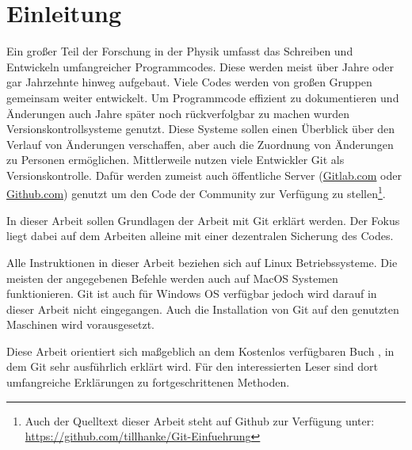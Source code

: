 \section{Einleitung}
Ein großer Teil der Forschung in der Physik umfasst das Schreiben und Entwickeln umfangreicher Programmcodes. Diese werden meist über Jahre oder gar Jahrzehnte hinweg aufgebaut. Viele Codes werden von großen Gruppen gemeinsam weiter entwickelt. Um Programmcode effizient zu dokumentieren und Änderungen auch Jahre später noch rückverfolgbar zu machen wurden Versionskontrollsysteme genutzt. Diese Systeme sollen einen Überblick über den Verlauf von Änderungen verschaffen, aber auch die Zuordnung von Änderungen zu Personen ermöglichen. Mittlerweile nutzen viele Entwickler Git als Versionskontrolle. Dafür werden zumeist auch öffentliche Server (\url{Gitlab.com} oder \url{Github.com}) genutzt um den Code der Community zur Verfügung zu stellen\footnote{Auch der Quelltext dieser Arbeit steht auf Github zur Verfügung unter: {\url{https://github.com/tillhanke/Git-Einfuehrung}}}.

In dieser Arbeit sollen Grundlagen der Arbeit mit Git erklärt werden. Der Fokus liegt dabei auf dem Arbeiten alleine mit einer dezentralen Sicherung des Codes.

Alle Instruktionen in dieser Arbeit beziehen sich auf Linux Betriebssysteme. Die meisten der angegebenen Befehle werden auch auf MacOS Systemen funktionieren. Git ist auch für Windows OS verfügbar jedoch wird darauf in dieser Arbeit nicht eingegangen. Auch die Installation von Git auf den genutzten Maschinen wird vorausgesetzt.

Diese Arbeit orientiert sich maßgeblich an dem Kostenlos verfügbaren Buch \cite{ProGit}, in dem Git sehr ausführlich erklärt wird. Für den interessierten Leser sind dort umfangreiche Erklärungen zu fortgeschrittenen Methoden.


